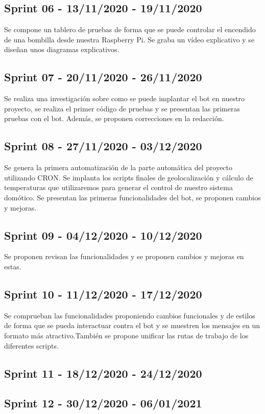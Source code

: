 \subsection{Sprint 06 - 13/11/2020 - 19/11/2020}
Se compone un tablero de pruebas de forma que se puede controlar el encendido de una bombilla desde nuestra Raspberry Pi. Se graba un vídeo explicativo y se diseñan unos diagramas explicativos.

\subsection{Sprint 07 - 20/11/2020 - 26/11/2020}
Se realiza una investigación sobre como se puede implantar el bot en nuestro proyecto, se realiza el primer código de pruebas y se presentan las primeras pruebas con el bot. Además, se proponen correcciones en la redacción.

\subsection{Sprint 08 - 27/11/2020 - 03/12/2020}
Se genera la primera automatización de la parte automática del proyecto utilizando CRON.
Se implanta los scripts finales de geolocalización y cálculo de temperaturas que utilizaremos para generar el control de nuestro sistema domótico.
Se presentan las primeras funcionalidades del bot, se proponen cambios y mejoras.

\subsection{Sprint 09 - 04/12/2020 - 10/12/2020}
Se proponen revisan las funcionalidades y se proponen cambios y mejoras en estas. 

\subsection{Sprint 10 - 11/12/2020 - 17/12/2020}
Se comprueban las funcionalidades proponiendo cambios funcionales y de estilos de forma que se pueda interactuar contra el bot y se muestren los mensajes en un formato más atractivo.También se propone unificar las rutas de trabajo de los diferentes scripts.

\subsection{Sprint 11 - 18/12/2020 - 24/12/2020}

\subsection{Sprint 12 - 30/12/2020 - 06/01/2021}

